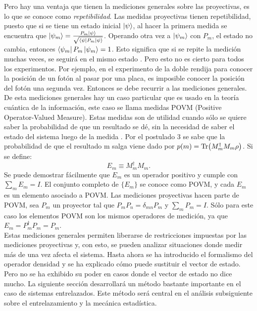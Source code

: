 Pero hay una ventaja que tienen  la mediciones generales sobre las proyectivas, es lo que se conoce como \textit{repetibilidad}. Las medidas proyectivas tienen repetibilidad, puesto que si se tiene un estado inicial $\ket{\psi}$, al hacer la primera medida se encuentra que $\ket{\psi_{m}}=\frac{P_{m}\ket{\psi}}{\sqrt{\bra{\psi}P_{m}\ket{\psi}}}$. Operando otra vez a $\ket{\psi_{m}}$ con $P_{m}$, el estado no cambia, entonces $\bra{\psi_{m}}P_{m}\ket{\psi_{m}}=1$. Esto significa que si se repite la medición muchas veces, se seguirá en el mismo estado \cite{VedralInformation}. Pero esto no es cierto para todos los experimentos. Por ejemplo, en el experimento de la doble rendija para conocer la posición de un fotón al pasar por una placa, es imposible conocer la posición del fotón una segunda vez. Entonces se debe recurrir a las mediciones generales. De esta mediciones generales hay un caso particular que es usado en la teoría cuántica de la información, este caso se llama medidas POVM (Positive Operator-Valued Measure). Estas medidas son de utilidad cuando sólo se quiere saber la probabilidad de que un resultado se dé, sin la necesidad de saber el estado del sistema luego de la medida \cite{NielsenInformation}.
Por el postulado 3 se sabe que la probabilidad de que el resultado m salga viene dado por $p(m)= \Tr (M^{\dagger}_{m}M_{m} \rho)$. Si se define:
\begin{equation}
E_{m} \equiv M^{\dagger}_{m}M_{m}.
\end{equation}
Se puede demostrar fácilmente que $E_{m}$ es un operador positivo y cumple con $\sum_{m} E_{m}=I$. El conjunto completo de $ \{ E_{m}\}$ se conoce como POVM, y cada $E_{m}$ es un elemento asociado a POVM. Las mediciones proyectivas hacen parte de POVM, sea $P_{m}$ un proyector tal que $P_{m}P_{n}= \delta_{mn}P_{m}$ y $\sum_{m}P_{m}=I$. Sólo para este caso los elementos POVM son los mismos operadores de medición, ya que $E_{m}=P_{m}^{\dagger}P_{m}=P_{m}$.
\\
Estas mediciones generales permiten liberarse de restricciones impuestas por las mediciones proyectivas y, con esto, se pueden analizar situaciones donde medir más de una vez afecta el sistema. Hasta ahora se ha introducido el formalismo del operador densidad y se ha explicado cómo puede sustituir el vector de estado. Pero no se ha exhibido su poder en casos donde el vector de estado no dice mucho. La siguiente sección desarrollará un método bastante importante en el caso de sistemas entrelazados. Este método será central en el análisis subsiguiente sobre el entrelazamiento y la mecánica estadística.

